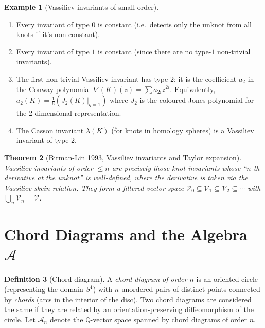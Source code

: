 \documentclass[12pt,a4paper]{amsart}
\newtheorem{theorem}{Theorem}[section]
\theoremstyle{definition}
\newtheorem{definition}[theorem]{Definition}
\newtheorem{example}[theorem]{Example}
\newcommand{\Q}{\mathbb{Q}}
\newcommand{\Ac}{\mathcal{A}}
\begin{document}
\begin{example}[Vassiliev invariants of small order]
\begin{enumerate}[label=(\alph*)]
  \item Every invariant of type $0$ is constant (i.e.\ detects only the unknot
        from all knots if it's non-constant).
  \item Every invariant of type $1$ is constant (since there are no
        type-$1$ non-trivial invariants).
  \item The first non-trivial Vassiliev invariant has type $2$; it is the
        coefficient $a_2$ in the Conway polynomial $\nabla(K)(z) = \sum a_{2i} z^{2i}$.
        Equivalently, $a_2(K) = \frac{1}{6}(J_2(K)|_{q=1})$ where $J_2$ is
        the coloured Jones polynomial for the 2-dimensional representation.
  \item The Casson invariant $\lambda(K)$ (for knots in homology spheres) is
        a Vassiliev invariant of type $2$.
\end{enumerate}
\end{example}

\begin{theorem}[Birman-Lin 1993, Vassiliev invariants and Taylor expansion]
\label{thm:birmanlin}
Vassiliev invariants of order $\leq n$ are precisely those knot invariants
whose ``$n$-th derivative at the unknot'' is well-defined, where the
derivative is taken via the Vassiliev skein relation.  They form a
filtered vector space $\mathcal{V}_0 \subseteq \mathcal{V}_1 \subseteq
\mathcal{V}_2 \subseteq \cdots$ with $\bigcup_n \mathcal{V}_n = \mathcal{V}$.
\end{theorem}

\section{Chord Diagrams and the Algebra $\mathcal{A}$}\label{sec:chord}

\begin{definition}[Chord diagram]
A \emph{chord diagram of order $n$} is an oriented circle (representing the
domain $S^1$) with $n$ unordered pairs of distinct points connected by
\emph{chords} (arcs in the interior of the disc).  Two chord diagrams are
considered the same if they are related by an orientation-preserving
diffeomorphism of the circle.  Let $\Ac_n$ denote the $\Q$-vector space
spanned by chord diagrams of order $n$.
\end{definition}
\end{document}

